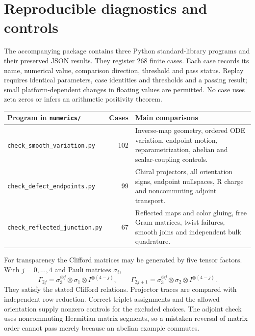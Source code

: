 \section{Reproducible diagnostics and controls}\label{app:diagnostics}

The accompanying package contains three Python standard-library
programs and their preserved JSON results. They register 268 finite
cases. Each case records its name, numerical value, comparison
direction, threshold and pass status. Replay requires identical
parameters, case identities and thresholds and a passing result;
small platform-dependent changes in floating values are permitted.
No case uses zeta zeros or infers an arithmetic positivity theorem.

\begin{center}
\begin{tabular}{@{}p{}rp{}@{}}
\toprule
Program in \texttt{numerics/} & Cases & Main comparisons\\
\midrule
\nolinkurl{check_smooth_variation.py} & 102 &
Inverse-map geometry, ordered ODE variation, endpoint motion,
reparametrization, abelian and scalar-coupling controls.\\
\nolinkurl{check_defect_endpoints.py} & 99 &
Chiral projectors, all orientation signs, endpoint nullspaces,
R charge and noncommuting adjoint transport.\\
\nolinkurl{check_reflected_junction.py} & 67 &
Reflected maps and color gluing, free Gram matrices, twist failures,
smooth joins and independent bulk quadrature.\\
\bottomrule
\end{tabular}
\end{center}

For transparency the Clifford matrices may be generated by five
tensor factors. With $j=0,\ldots,4$ and Pauli matrices $\sigma_i$,
\begin{equation}
 \Gamma_{2j}=\sigma_3^{\otimes j}\otimes\sigma_1\otimes I^{\otimes(4-j)},
 \qquad
 \Gamma_{2j+1}=\sigma_3^{\otimes j}\otimes\sigma_2\otimes I^{\otimes(4-j)}.
\end{equation}
They satisfy the stated Clifford relations. Projector traces are
compared with independent row reduction. Correct triplet assignments
and the allowed orientation supply nonzero controls for the excluded
choices. The adjoint check uses noncommuting Hermitian matrix segments,
so a mistaken reversal of matrix order cannot pass merely because an
abelian example commutes.

